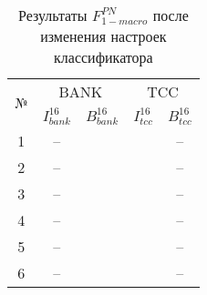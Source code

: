 \begin{table}[htp!]
\centering
\caption{Результаты $F_{1-macro}^{PN}$ после изменения настроек классификатора}
\label{table:cost}
\begin{tabular}{ccccc}
\hline
\multicolumn{1}{c|}{\multirow{2}{*}{№}} & \multicolumn{2}{c|}{BANK}                                                   & \multicolumn{2}{c}{TCC}                                           \\ \cline{2-5}
\multicolumn{1}{c|}{}                   & \multicolumn{1}{c|}{$I_{bank}^{16}$} & \multicolumn{1}{c|}{$B_{bank}^{16}$} & \multicolumn{1}{c|}{$I_{tcc}^{16}$}  & $B_{tcc}^{16}$             \\ \hline
1                                       & --                                   &                                      &                                      & --                         \\
2                                       & --                                   &                                      &                                      & --                         \\
3                                       & --                                   &                                      &                                      & --                         \\
4                                       & --                                   &                                      &                                      & --                         \\
5                                       & --                                   &                                      &                                      & --                         \\
6                                       & --                                   &                                      &                                      & --                         \\ \hline
\end{tabular}
\end{table}


